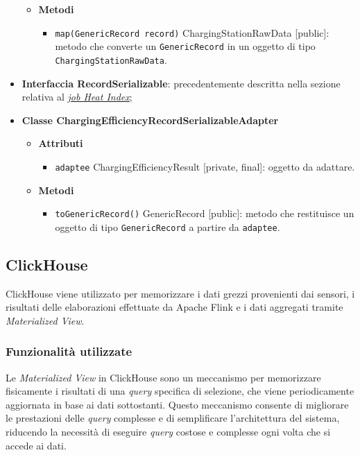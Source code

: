 \begin{itemize}
	      \begin{itemize}
		      \item \textbf{Metodi}
		            \begin{itemize}
			            \item \texttt{map(GenericRecord record)} ChargingStationRawData [public]: metodo che converte un \texttt{GenericRecord} in un oggetto di tipo \texttt{ChargingStationRawData}.
		            \end{itemize}
	      \end{itemize}
	\item \textbf{Interfaccia RecordSerializable}: precedentemente descritta nella sezione relativa al \hyperref[record_serializable]{\textit{\underline{job Heat Index}}};
	\item \textbf{Classe ChargingEfficiencyRecordSerializableAdapter}
	      \begin{itemize}
		      \item \textbf{Attributi}
		            \begin{itemize}
			            \item \texttt{adaptee} ChargingEfficiencyResult [private, final]: oggetto da adattare.
		            \end{itemize}
		      \item \textbf{Metodi}
		            \begin{itemize}
			            \item \texttt{toGenericRecord()} GenericRecord [public]: metodo che restituisce un oggetto di tipo \texttt{GenericRecord} a partire da \texttt{adaptee}.
		            \end{itemize}
	      \end{itemize}
\end{itemize}

\subsection{ClickHouse}
ClickHouse viene utilizzato per memorizzare i dati grezzi provenienti dai sensori, i risultati delle elaborazioni effettuate da Apache Flink e i dati aggregati tramite
\textit{Materialized View}.\\

\subsubsection{Funzionalità utilizzate}
Le \textit{Materialized View} in ClickHouse sono un meccanismo per memorizzare fisicamente i risultati di una \textit{query} specifica di selezione,
che viene periodicamente aggiornata in base ai dati sottostanti. Questo meccanismo consente di migliorare le prestazioni delle \textit{query} complesse
e di semplificare l'architettura del sistema, riducendo la necessità di eseguire \textit{query} costose e complesse ogni volta che si accede ai dati.

